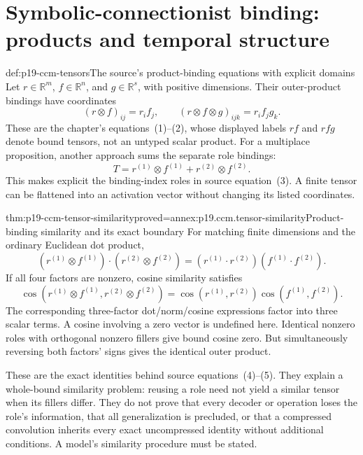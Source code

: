 \section{Symbolic-connectionist binding: products and temporal structure}
\label{sec:p19-ccm-hybrid}

\begin{hbdefinition}{def:p19-ccm-tensors}{The source's product-binding equations with explicit domains}
Let \(r\in\mathbb R^m\), \(f\in\mathbb R^n\), and
\(g\in\mathbb R^s\), with positive dimensions. Their outer-product
bindings have coordinates
\[
 (r\otimes f)_{ij}=r_i f_j,
 \qquad (r\otimes f\otimes g)_{ijk}=r_i f_j g_k.
\]
These are the chapter's equations~(1)--(2), whose displayed labels
\(rf\) and \(rfg\) denote bound tensors, not an untyped scalar
product. For a multiplace proposition, another approach sums the
separate role bindings:
\[
 T=r^{(1)}\otimes f^{(1)}+r^{(2)}\otimes f^{(2)}.
\]
This makes explicit the binding-index roles in source equation~(3).
A finite tensor can be flattened into an activation vector without
changing its listed coordinates.
\end{hbdefinition}

\begin{hbtheorem}{thm:p19-ccm-tensor-similarity}{proved=annex:p19.ccm.tensor-similarity}{Product-binding similarity and its exact boundary}
For matching finite dimensions and the ordinary Euclidean dot product,
\[
 (r^{(1)}\otimes f^{(1)})\cdot(r^{(2)}\otimes f^{(2)})
 =(r^{(1)}\cdot r^{(2)})(f^{(1)}\cdot f^{(2)}).
\]
If all four factors are nonzero, cosine similarity satisfies
\[
 \operatorname{cos}(r^{(1)}\otimes f^{(1)},r^{(2)}\otimes f^{(2)})
 =\operatorname{cos}(r^{(1)},r^{(2)})
  \operatorname{cos}(f^{(1)},f^{(2)}).
\]
The corresponding three-factor dot/norm/cosine expressions factor into
three scalar terms. A cosine involving a zero vector is undefined here.
Identical nonzero roles with orthogonal nonzero fillers give bound
cosine zero. But simultaneously reversing both factors' signs gives
the identical outer product.
\end{hbtheorem}

These are the exact identities behind source equations~(4)--(5).
They explain a whole-bound similarity problem: reusing a role need
not yield a similar tensor when its fillers differ. They do not prove
that every decoder or operation loses the role's information, that
all generalization is precluded, or that a compressed convolution
inherits every exact uncompressed identity without additional
conditions. A model's similarity procedure must be stated.

